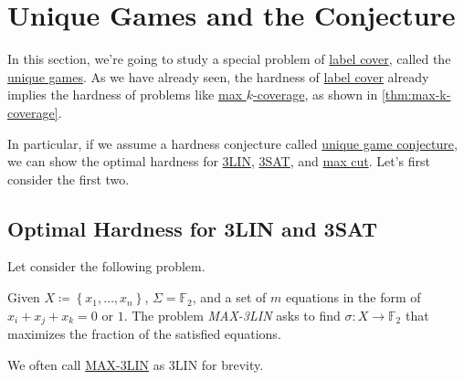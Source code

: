 \chapter{Unique Games and the Conjecture}

In this section, we're going to study a special problem of \hyperref[prb:label-cover]{label cover}, called the \hyperref[prb:unique-game]{unique games}. As we have already seen, the hardness of \hyperref[prb:label-cover]{label cover} already implies the hardness of problems like \hyperref[prb:max-k-coverage]{max \(k\)-coverage}, as shown in \autoref{thm:max-k-coverage}.

In particular, if we assume a hardness conjecture called \hyperref[conj:unique-game]{unique game conjecture}, we can show the optimal hardness for \hyperref[prb:max-3LIN]{3LIN}, \hyperref[prb:max-3SAT]{3SAT}, and \hyperref[prb:max-cut]{max cut}. Let's first consider the first two.

\section{Optimal Hardness for 3LIN and 3SAT}
Let consider the following problem.
\begin{problem}\label{prb:max-3LIN}
Given \(X\coloneqq \left\{ x_1, \ldots , x_n  \right\} \), \(\Sigma = \mathbb{F} _2\), and a set of \(m\) equations in the form of \(x_i + x_j + x_k = 0\) or \(1\). The problem \emph{MAX-3LIN} asks to find \(\sigma \colon X\to \mathbb{F} _2\) that maximizes the fraction of the satisfied equations.
\end{problem}

\begin{remark}
	We often call \hyperref[prb:max-3LIN]{MAX-3LIN} as 3LIN for brevity.
\end{remark}

